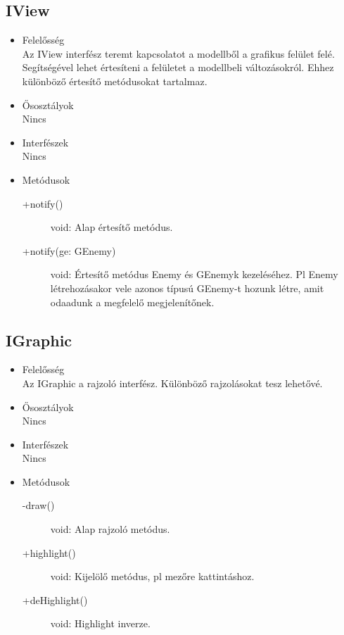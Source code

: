 \subsection{IView}
\begin{itemize}
\item Felelősség\\
Az IView interfész teremt kapcsolatot a modellből a grafikus felület felé. Segítségével lehet értesíteni a felületet a modellbeli változásokról. Ehhez különböző értesítő metódusokat tartalmaz.
\item Ősosztályok\\
Nincs
\item Interfészek\\
Nincs
\item Metódusok\\
	\begin{description}
		\item[+notify()] void: Alap értesítő metódus.
		\item[+notify(ge: GEnemy)] void: Értesítő metódus Enemy és GEnemyk kezeléséhez. Pl Enemy létrehozásakor vele azonos típusú GEnemy-t hozunk létre, amit odaadunk a megfelelő megjelenítőnek.
	\end{description}
\end{itemize}

\subsection{IGraphic}
\begin{itemize}
\item Felelősség\\
Az IGraphic a rajzoló interfész. Különböző rajzolásokat tesz lehetővé.
\item Ősosztályok\\
Nincs
\item Interfészek\\
Nincs
\item Metódusok\\
	\begin{description}
		\item[-draw()] void: Alap rajzoló metódus.
		\item[+highlight()] void: Kijelölő metódus, pl mezőre kattintáshoz.
		\item[+deHighlight()] void: Highlight inverze.
	\end{description}
\end{itemize}


